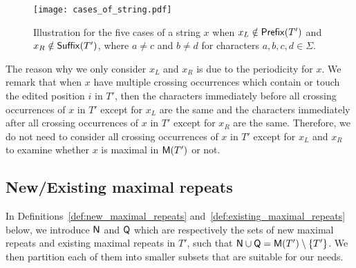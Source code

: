 \begin{figure}[H]
  \centering
  \texttt{[image: cases\_of\_string.pdf]}
  \caption{Illustration for the five cases of a string $x$ when $x_L \notin \mathsf{Prefix}(T')$ and $x_R \notin \mathsf{Suffix}(T')$, where $a \ne c$ and $b \ne d$ for characters $a,b,c,d \in \Sigma$.}
  \label{fig:case}
\end{figure}

The reason why we only consider $x_L$ and $x_R$ is due to the periodicity for $x$.
We remark that when $x$ have multiple crossing occurrences which contain or touch the edited position $i$ in $T'$,
then the characters immediately before all crossing occurrences of $x$ in $T'$ except for $x_L$ are the same and the characters immediately after all crossing occurrences of $x$ in $T'$ except for $x_R$ are the same.
Therefore, we do not need to consider all crossing occurrences of $x$ in $T'$ except for $x_L$ and $x_R$ to examine whether $x$ is maximal in $\mathsf{M}(T')$ or not.

\subsection{New/Existing maximal repeats}

In Definitions~\ref{def:new_maximal_repeats} and~\ref{def:existing_maximal_repeats} below, we introduce $\mathsf{N}$ and $\mathsf{Q}$ which are respectively
the sets of new maximal repeats and existing maximal repeats in $T'$,
such that $\mathsf{N} \cup \mathsf{Q} = \mathsf{M}(T') \setminus \{T'\}$.
We then partition each of them into smaller subsets that are suitable for our needs.

